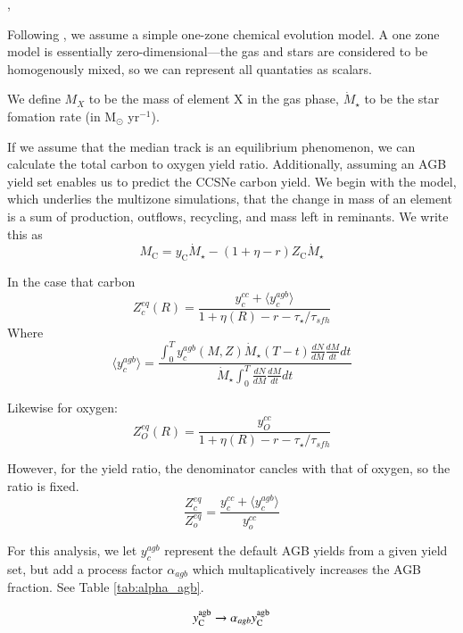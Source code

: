 \documentclass[12pt,oneside]{report}
\newcommand{\Ycagb}{\ensuremath{y_{\rm C}^{\rm agb}}}
\begin{document}
\cite{james_dwarf}, \cite{james+22}

Following \citet{WAF17}, we assume a simple one-zone chemical evolution model. A one zone model is essentially zero-dimensional---the gas and stars are considered to be homogenously mixed, so we can represent all quantaties as scalars.

We define $M_{X}$ to be the mass of element X in the gas phase, $\dot{M}_\star$ to be the star fomation rate (in M$_\odot$ yr$^{-1}$).

If we assume that the median track is an equilibrium phenomenon, we can calculate the total carbon to oxygen yield ratio. Additionally, assuming an AGB yield set enables us to predict the CCSNe carbon yield.  
We begin with the model, which underlies the multizone simulations, that the change in mass of an element is a sum of production, outflows, recycling, and mass left in reminants. We write this as
\begin{equation}
M_\text{C} = y_\text{C} \dot{M}_\star - (1 + \eta - r) Z_\text{C} \dot{M}_\star
\end{equation}

In the case that carbon
\begin{equation}
Z_c^{eq}(R) = \frac{y_c^{cc} + \langle y_c^{agb} \rangle }{1 + \eta(R) - r - \tau_\star / \tau_{sfh}}
\end{equation}Where
\begin{equation}
\langle y_c^{agb} \rangle = \frac{\int_0^T y_c^{agb}(M, Z) \dot{M}_\star(T - t) \frac{dN}{dM} \frac{dM}{dt} dt  }{ \dot{M}_\star \int_0^T \frac{dN}{dM} \frac{dM}{dt} dt}
\end{equation}

Likewise for oxygen:
\begin{equation}
Z_O^{eq}(R) = \frac{y_O^{cc}}{1 + \eta(R) - r - \tau_\star / \tau_{sfh}}
\end{equation}

However, for the yield ratio, the denominator cancles with that of oxygen, so the ratio is fixed.
\begin{equation}
\frac{Z_c^{eq}}{Z_o^{eq}} = \frac{y_c^{cc} + \langle y_c^{agb} \rangle }{y_o^{cc}}
\end{equation}

For this analysis, we let $y_c^{agb}$ represent the default AGB yields from a given yield set, but add a process factor $\alpha_{agb}$ which multaplicatively increases the AGB fraction. See Table \ref{tab:alpha_agb}.

\begin{equation}
    \Ycagb \rightarrow \alpha_{agb}  \Ycagb
\end{equation}
\end{document}
